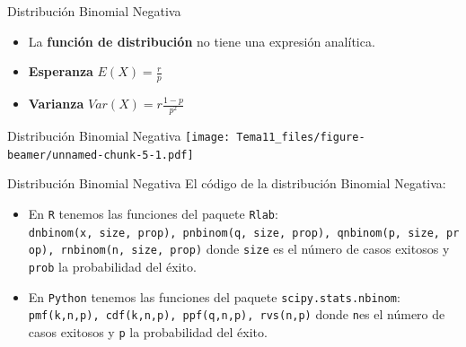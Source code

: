 \documentclass[
  ignorenonframetext,
]{beamer}
\providecommand{\tightlist}{%
  \setlength{\itemsep}{0pt}\setlength{\parskip}{0pt}}
\begin{document}
\begin{frame}{Distribución Binomial Negativa}
\protect\hypertarget{distribuciuxf3n-binomial-negativa-1}{}
\begin{itemize}
\tightlist
\item
  La \textbf{función de distribución} no tiene una expresión analítica.
\item
  \textbf{Esperanza} \(E(X) = \frac{r}{p}\)
\item
  \textbf{Varianza} \(Var(X) = r\frac{1-p}{p^2}\)
\end{itemize}
\end{frame}

\begin{frame}{Distribución Binomial Negativa}
\protect\hypertarget{distribuciuxf3n-binomial-negativa-2}{}
\texttt{[image: Tema11\_files/figure-beamer/unnamed-chunk-5-1.pdf]}
\end{frame}

\begin{frame}[fragile]{Distribución Binomial Negativa}
\protect\hypertarget{distribuciuxf3n-binomial-negativa-3}{}
El código de la distribución Binomial Negativa:

\begin{itemize}
\tightlist
\item
  En \texttt{R} tenemos las funciones del paquete \texttt{Rlab}:
  \texttt{dnbinom(x,\ size,\ prop),\ pnbinom(q,\ size,\ prop),\ qnbinom(p,\ size,\ prop),\ rnbinom(n,\ size,\ prop)}
  donde \texttt{size} es el número de casos exitosos y \texttt{prob} la
  probabilidad del éxito.
\item
  En \texttt{Python} tenemos las funciones del paquete
  \texttt{scipy.stats.nbinom}:
  \texttt{pmf(k,n,p),\ cdf(k,n,p),\ ppf(q,n,p),\ rvs(n,p)} donde
  \texttt{n}es el número de casos exitosos y \texttt{p} la probabilidad
  del éxito.
\end{itemize}
\end{frame}
\end{document}
